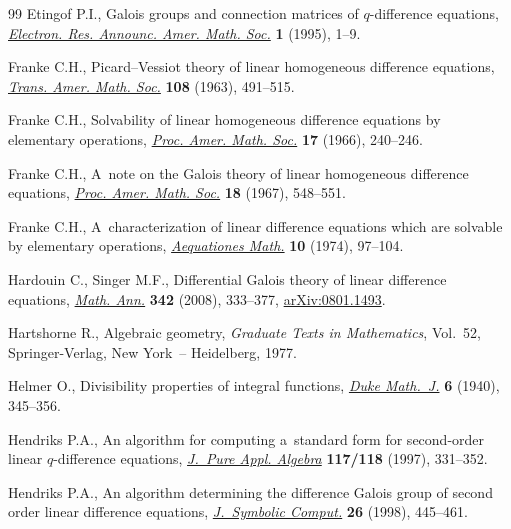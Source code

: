 \documentclass[pdftex]{sigma}
\numberwithin{equation}{section}
\begin{document}
\begin{thebibliography}{99}
Etingof P.I., Galois groups and connection matrices of {$q$}-dif\/ference equations,
\href{http://dx.doi.org/10.1090/S1079-6762-95-01001-8}{\textit{Electron. Res. Announc. Amer. Math. Soc.}} \textbf{1} (1995), 1--9.

Franke C.H., Picard--{V}essiot theory of linear homogeneous dif\/ference equations,
\href{http://dx.doi.org/10.1090/S0002-9947-1963-0155819-3}{\textit{Trans. Amer. Math. Soc.}} \textbf{108} (1963), 491--515.

Franke C.H., Solvability of linear homogeneous dif\/ference equations by elementary operations,
\href{http://dx.doi.org/10.1090/S0002-9939-1966-0190133-X}{\textit{Proc. Amer. Math. Soc.}} \textbf{17} (1966), 240--246.

Franke C.H., A~note on the {G}alois theory of linear homogeneous dif\/ference equations,
\href{http://dx.doi.org/10.1090/S0002-9939-1967-0210693-0}{\textit{Proc. Amer. Math. Soc.}} \textbf{18} (1967), 548--551.

Franke C.H., A~characterization of linear dif\/ference equations which are solvable by elementary operations,
\href{http://dx.doi.org/10.1007/BF01834785}{\textit{Aequationes Math.}} \textbf{10} (1974), 97--104.

Hardouin C., Singer M.F., Dif\/ferential {G}alois theory of linear dif\/ference equations,
\href{http://dx.doi.org/10.1007/s00208-008-0238-z}{\textit{Math. Ann.}} \textbf{342} (2008), 333--377, \href{http://arxiv.org/abs/0801.1493}{arXiv:0801.1493}.

Hartshorne R., Algebraic geometry, \textit{Graduate Texts in Mathematics}, Vol.~52, Springer-Verlag, New York~--
Heidelberg, 1977.

Helmer O., Divisibility properties of integral functions,
\href{http://dx.doi.org/10.1215/S0012-7094-40-00626-3}{\textit{Duke Math.~J.}} \textbf{6} (1940), 345--356.

Hendriks P.A., An algorithm for computing a~standard form for second-order linear {$q$}-dif\/ference equations,
\href{http://dx.doi.org/10.1016/S0022-4049(97)00017-0}{\textit{J.~Pure Appl. Algebra}} \textbf{117/118} (1997), 331--352.

Hendriks P.A., An algorithm determining the dif\/ference {G}alois group of second order linear dif\/ference equations,
\href{http://dx.doi.org/10.1006/jsco.1998.0223}{\textit{J.~Symbolic Comput.}} \textbf{26} (1998), 445--461.


\end{thebibliography}
\end{document}
